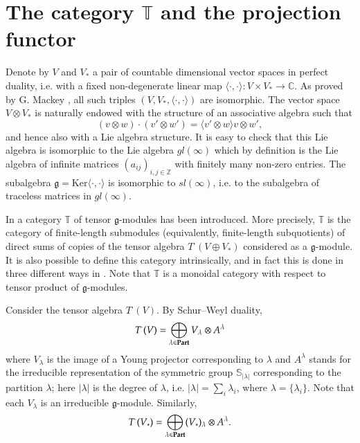 \documentclass[11pt]{amsart}
\renewcommand{\gg}{\mathfrak{g}}
\newcommand{\Ker}{\mathrm{Ker}}
\newcommand{\field}[1]{\mathbb{#1}}
\begin{document}
\section{The category $\mathbb T$ and the projection functor}


Denote by $V$ and $V_*$ a pair of countable dimensional vector spaces
in perfect duality, i.e. with a fixed non-degenerate linear map $\langle\cdot,\cdot\rangle : V\times V_*\to\mathbb C$.
As proved by G. Mackey \cite{Mk}, all such triples $(V,V_*,\langle\cdot,\cdot\rangle)$ are
isomorphic. The vector space $V\otimes V_*$ is naturally endowed with
the structure of an
associative algebra such that $$(v\otimes w)\cdot (v'\otimes w')=\langle v'\otimes w\rangle v\otimes w',$$ and hence also with a Lie algebra structure.
It is easy to check that this Lie algebra is isomorphic to the Lie algebra
$gl(\infty)$ which by definition is the Lie algebra of
infinite matrices $(a_{ij})_{i,j\in\mathbb Z}$ with finitely many non-zero entries. The subalgebra $\gg=\Ker \langle\cdot,\cdot\rangle$ is isomorphic to
$sl(\infty)$, i.e. to the subalgebra of traceless matrices
in  $gl(\infty)$. 

In \cite{DPS} a category $\mathbb T$ of tensor
$\gg$-modules has been introduced. More precisely, $\mathbb T$ is the
category of finite-length submodules (equivalently, finite-length
subquotients) of direct sums of copies of the tensor algebra
$T^\cdot(V\oplus V_*)$ considered as a $\gg$-module. It is also possible to define this category intrinsically,
and in fact this is done in three different ways in \cite{DPS}. Note that
$\mathbb T$ is a monoidal category with respect to tensor product of $\gg$-modules.


Consider the tensor algebra $T^\cdot (V)$. By Schur--Weyl duality,
$$T^\cdot (V)=\bigoplus_{\lambda\in\bold{Part}}V_\lambda\otimes A^\lambda$$
where $V_\lambda$ is the image of a Young projector corresponding to
$\lambda$ and $A^\lambda$ stands for the irreducible
representation of the symmetric group $\field{S}_{|\lambda|}$ corresponding to
the partition $\lambda$; here $|\lambda|$ is the degree of $\lambda$,
i.e. $|\lambda|=\sum_{i}\lambda_i$, where
$\lambda=\{\lambda_i\}$. Note that each $V_\lambda$ is an irreducible
$\gg$-module. Similarly,
$$T^\cdot (V_*)=\bigoplus_{\lambda\in\bold{Part}}(V_*)_\lambda\otimes A^\lambda.$$
\end{document}
